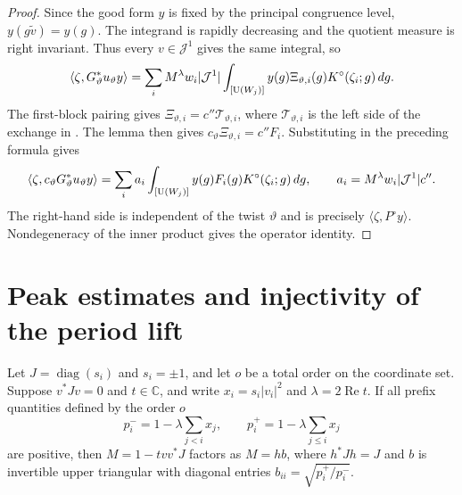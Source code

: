 \begin{proof}
Since the good form $y$ is fixed by the principal congruence level, $y(g\widetilde v)=y(g)$. The integrand is rapidly decreasing and the quotient measure is right invariant. Thus every $v\in\mathcal J^1$ gives the same integral, so
\[
 \langle\zeta,G_\vartheta^*u_\vartheta y\rangle
 =\sum_i M^\lambda w_i|\mathcal J^1|
  \int_{[\operatorname{U}(W_j)]} y(g)\Xi_{\vartheta,i}(g)K^\circ(\zeta_i;g)\,dg .
\]
The first-block pairing gives $\Xi_{\vartheta,i}=c''\mathcal T_{\vartheta,i}$, where $\mathcal T_{\vartheta,i}$ is the left side of the exchange in . The lemma then gives $c_\vartheta\Xi_{\vartheta,i}=c''F_i$. Substituting in the preceding formula gives
\[
 \langle\zeta,c_\vartheta G_\vartheta^*u_\vartheta y\rangle
 =\sum_i a_i
  \int_{[\operatorname{U}(W_j)]} y(g)F_i(g)K^\circ(\zeta_i;g)\,dg,
 \qquad a_i=M^\lambda w_i|\mathcal J^1|c''.
\]
The right-hand side is independent of the twist $\vartheta$ and is precisely $\langle\zeta,P^\circ y\rangle$. Nondegeneracy of the inner product gives the operator identity.
\end{proof}

\section{Peak estimates and injectivity of the period lift}
\label{sec:c-period-injective}

\begin{lemma}
\label{lem:c-peak-triangular-factor}
\emitthmsource
Let $J=\operatorname{diag}(s_i)$ and $s_i=\pm1$, and let $o$ be a total order on the coordinate set. Suppose $v^*Jv=0$ and $t\in\mathbb C$, and write $x_i=s_i|v_i|^2$ and $\lambda=2\operatorname{Re}t$. If all prefix quantities defined by the order $o$
\[
 p_i^-=1-\lambda\sum_{j<i}x_j,\qquad
 p_i^+=1-\lambda\sum_{j\le i}x_j
\]
are positive, then $M=1-tv v^*J$ factors as $M=hb$, where $h^*Jh=J$ and $b$ is invertible upper triangular with diagonal entries $b_{ii}=\sqrt{p_i^+/p_i^-}$.
\end{lemma}

